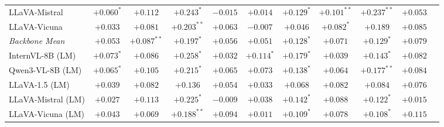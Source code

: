 \begin{table}[h]
\begin{tabular}{lcccccccccc}
\quad LLaVA-Mistral & \cellcolor{orange!12}$+0.060^{*}$ & \cellcolor{orange!24}$+0.112$ & \cellcolor{orange!24}$+0.243^{*}$ & $-0.015$ & $+0.014$ & \cellcolor{orange!24}$+0.129^{*}$ & \cellcolor{orange!24}$+0.101^{**}$ & \cellcolor{orange!24}$+0.237^{**}$ & \cellcolor{orange!12}$+0.053$ \\
\quad LLaVA-Vicuna & \cellcolor{orange!12}$+0.033$ & \cellcolor{orange!12}$+0.081$ & \cellcolor{orange!24}$+0.203^{**}$ & \cellcolor{orange!12}$+0.063$ & $-0.007$ & \cellcolor{orange!12}$+0.046$ & \cellcolor{orange!12}$+0.082^{*}$ & \cellcolor{orange!24}$+0.189$ & \cellcolor{orange!12}$+0.085$ \\
\rowcolor{gray!12}\textit{Backbone Mean} & \cellcolor{orange!12}$+0.053$ & \cellcolor{orange!12}$+0.087^{**}$ & \cellcolor{orange!24}$+0.197^{*}$ & \cellcolor{orange!12}$+0.056$ & \cellcolor{orange!12}$+0.051$ & \cellcolor{orange!24}$+0.128^{*}$ & \cellcolor{orange!12}$+0.071$ & \cellcolor{orange!24}$+0.129^{*}$ & \cellcolor{orange!12}$+0.079$ \\
\midrule
\quad InternVL-8B (LM) & \cellcolor{orange!12}$+0.073^{*}$ & \cellcolor{orange!12}$+0.086$ & \cellcolor{orange!24}$+0.258^{*}$ & \cellcolor{orange!12}$+0.032$ & \cellcolor{orange!24}$+0.114^{*}$ & \cellcolor{orange!24}$+0.179^{*}$ & \cellcolor{orange!12}$+0.039$ & \cellcolor{orange!24}$+0.143^{*}$ & \cellcolor{orange!12}$+0.082$ \\
\quad Qwen3-VL-8B (LM) & \cellcolor{orange!12}$+0.065^{*}$ & \cellcolor{orange!24}$+0.105$ & \cellcolor{orange!24}$+0.215^{*}$ & \cellcolor{orange!12}$+0.065$ & \cellcolor{orange!12}$+0.073$ & \cellcolor{orange!24}$+0.138^{*}$ & \cellcolor{orange!12}$+0.064$ & \cellcolor{orange!24}$+0.177^{**}$ & \cellcolor{orange!12}$+0.084$ \\
\quad LLaVA-1.5 (LM) & \cellcolor{orange!12}$+0.039$ & \cellcolor{orange!12}$+0.082$ & \cellcolor{orange!24}$+0.136$ & \cellcolor{orange!12}$+0.054$ & \cellcolor{orange!12}$+0.033$ & \cellcolor{orange!12}$+0.068$ & \cellcolor{orange!12}$+0.082$ & \cellcolor{orange!12}$+0.084$ & \cellcolor{orange!12}$+0.076$ \\
\quad LLaVA-Mistral (LM) & \cellcolor{orange!12}$+0.027$ & \cellcolor{orange!24}$+0.113$ & \cellcolor{orange!24}$+0.225^{*}$ & $-0.009$ & \cellcolor{orange!12}$+0.038$ & \cellcolor{orange!24}$+0.142^{*}$ & \cellcolor{orange!12}$+0.088$ & \cellcolor{orange!24}$+0.122^{*}$ & $+0.015$ \\
\quad LLaVA-Vicuna (LM) & \cellcolor{orange!12}$+0.043$ & \cellcolor{orange!12}$+0.069$ & \cellcolor{orange!24}$+0.188^{**}$ & \cellcolor{orange!12}$+0.094$ & $+0.011$ & \cellcolor{orange!24}$+0.109^{*}$ & \cellcolor{orange!12}$+0.078$ & \cellcolor{orange!24}$+0.108^{*}$ & \cellcolor{orange!24}$+0.115$ \\

\end{tabular}
\end{table}
